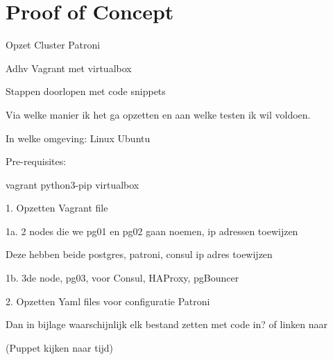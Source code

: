 
\chapter{Proof of Concept}

\label{ch:Proof of Concept}


Opzet Cluster Patroni

Adhv Vagrant met virtualbox

Stappen doorlopen met code snippets

Via welke manier ik het ga opzetten en aan welke testen ik wil voldoen.

In welke omgeving: Linux Ubuntu

Pre-requisites:

vagrant
python3-pip
virtualbox


1. Opzetten Vagrant file

1a. 2 nodes die we pg01 en pg02 gaan noemen, ip adressen toewijzen

Deze hebben beide postgres, patroni, consul
ip adres toewijzen

1b. 3de node, pg03, voor Consul, HAProxy, pgBouncer


2. Opzetten Yaml files voor configuratie Patroni





Dan in bijlage waarschijnlijk elk bestand zetten met code in?
of linken naar 




(Puppet kijken naar tijd)
